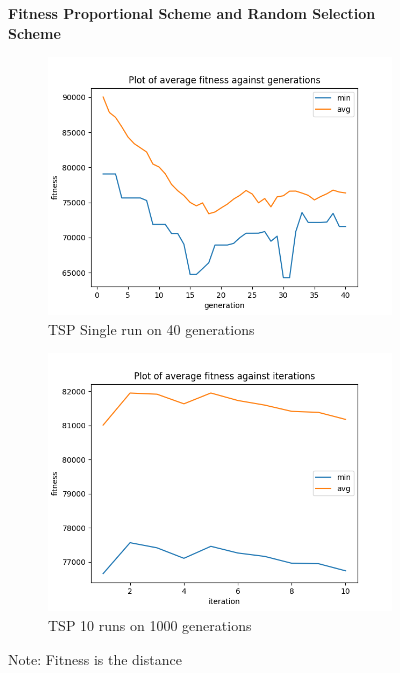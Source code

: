 \documentclass[a4paper]{exam}
\begin{document}
\begin{questions}
  \begin{figure}[H]
    \centering
    \textbf{Fitness Proportional Scheme and Random Selection Scheme}
    \begin{subfigure}{.5\textwidth}
      \centering
      \includegraphics[width=1\linewidth]{images/tsp_fps_rd_gen.png}
      \caption{TSP Single run on 40 generations}
      \label{fig:tsp_fps_rd_sub1}
    \end{subfigure}%
    \begin{subfigure}{.5\textwidth}
      \centering
      \includegraphics[width=1\linewidth]{images/tsp_fps_rd_itr.png}
      \caption{TSP 10 runs on 1000 generations}
      \label{fig:tsp_fps_rd_sub2}
    \end{subfigure}
    \caption{Note: Fitness is the distance}
    \label{fig:tsp_fps_rd}
  \end{figure}


\end{questions}
\end{document}
